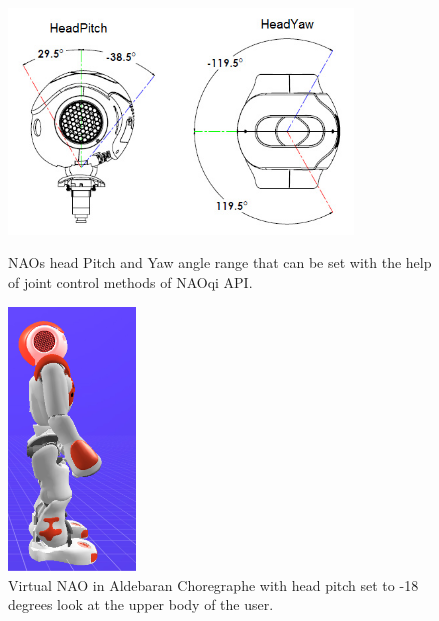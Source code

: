 \begin{figure}	 	
	\begin{minipage}
		{.6
		\textwidth}  	
		\includegraphics[height=60mm]{figures/content/nao-head.jpg} \caption{NAOs head Pitch and Yaw angle range that can be set with the help of joint control methods of NAOqi API. \cite{8} } \label{fg:nao:head} 
	\end{minipage}
	\hspace{10 mm}
	\begin{minipage}
		{.3
		\textwidth}  
		\centering
		\includegraphics[height=70mm]{figures/content/nao-head-stand.jpg} \caption{Virtual NAO in Aldebaran Choregraphe with head pitch set to -18 degrees look at the upper body of the user.} \label{fg:nao:head:stand} 
	\end{minipage}	
\end{figure}


